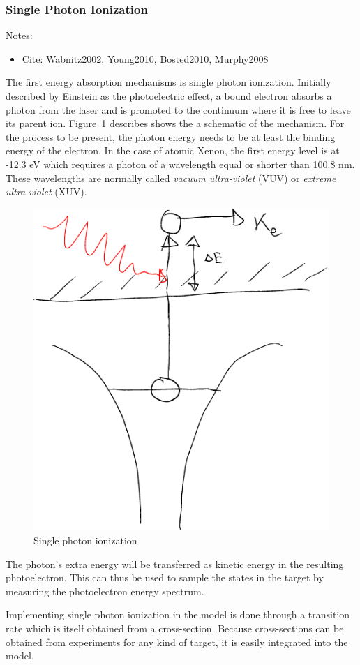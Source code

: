 \subsubsection{Single Photon Ionization}
Notes:
\begin{itemize}
\item Cite: Wabnitz2002, Young2010, Bosted2010, Murphy2008
\end{itemize}

The first energy absorption mechanisms is single photon ionization. Initially
described by Einstein as the photoelectric effect, a bound electron
absorbs a photon from the laser and is promoted to the continuum where it is
free to leave its parent ion. Figure~\ref{fig:ionization:single} describes
shows the a schematic of the mechanism. For the process to be present, the
photon energy
needs to be at least the binding energy of the electron. In the case of
atomic Xenon, the first energy level is at -12.3 eV which requires a photon
of a wavelength equal or shorter than 100.8 nm. These wavelengths are normally
called \textit{vacuum ultra-violet} (VUV) or \textit{extreme
ultra-violet} (XUV).

\begin{figure}
 \centering
 \includegraphics[width=0.38\columnwidth]{figures/mockups/ionization_single}
 \caption{Single photon ionization}
 \label{fig:ionization:single}
\end{figure}


The photon's extra energy will be transferred as kinetic energy in the
resulting photoelectron. This can thus be used to sample the states in the
target by measuring the photoelectron energy spectrum\cite{Fennel2010}.

Implementing single photon ionization in the model is done through a
transition rate which is itself obtained from a cross-section. Because
cross-sections can be obtained from experiments for any kind of target, it is
easily integrated into the model.

